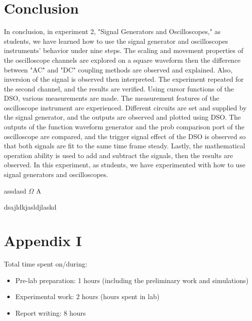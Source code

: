 \documentclass[letterpaper,12pt]{article}
\begin{document}
\section{Conclusion}
In conclusion, in experiment 2, "Signal Generators and Oscilloscopes," as students, we have learned how to use the signal generator and oscilloscopes instruments' behavior under nine steps. The scaling and movement properties of the oscilloscope channels are explored on a square waveform then the difference between "AC" and "DC" coupling methods are observed and explained. Also, inversion of the signal is observed then interpreted. The experiment repeated for the second channel, and the results are verified. Using cursor functions of the DSO, various measurements are made. The measurement features of the oscilloscope instrument are experienced. Different circuits are set and supplied by the signal generator, and the outputs are observed and plotted using DSO. The outputs of the function waveform generator and the prob comparison port of the oscilloscope are compared, and the trigger signal effect of the DSO is observed so that both signals are fit to the same time frame steady. Lastly, the mathematical operation ability is used to add and subtract the signals, then the results are observed.  In this experiment, as students, we have experimented with how to use signal generators and oscilloscopes.


assdasd \( \Omega \) A

dsajldkjasldjlaskd
\section*{Appendix I}
Total time spent on/during:
\begin{itemize}
	\item Pre-lab preparation: 1 hours (including the preliminary work and simulations) 
	\item Experimental work: 2 hours (hours spent in lab)
	\item Report writing: 8 hours 
\end{itemize}



\end{document}
